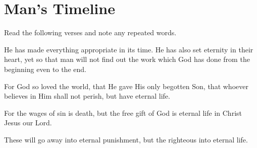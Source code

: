 \newpage
\section{Man's Timeline}


Read the following verses and note any repeated words. 
\vspace{2\baselineskip}

\begin{scripture}[Ecclesiastes 3:11]
         He has made everything appropriate in its time. 
        He has also set eternity in their heart, yet so that man 
        will not find out the work which God has done from the 
        beginning even to the end.

\end{scripture}

\vspace{2\baselineskip}

\begin{scripture}[John 3:16]
         For God so loved the world, that He gave His
         only begotten Son, that whoever believes in Him shall not perish, but have eternal life.
\end{scripture}

\vspace{2\baselineskip}

\begin{scripture}[Romans 6:23]
         For the wages of sin is death, but the free gift of God is eternal life in Christ Jesus our Lord.
\end{scripture}

\vspace{2\baselineskip}

\begin{scripture}[Matthew 25:46]
         These will go away into eternal punishment, but the righteous into eternal life.
\end{scripture}

